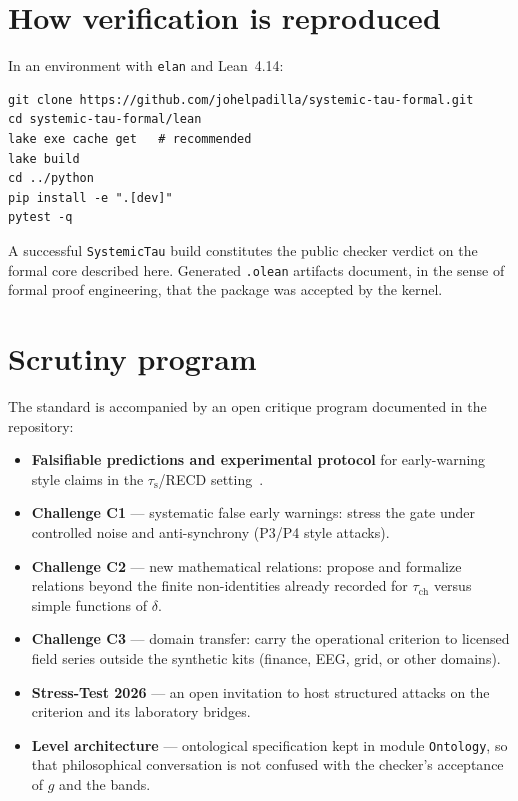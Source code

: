\documentclass[11pt,a4paper]{article}
\newcommand{\taus}{\tau_{\mathrm{s}}}
\newcommand{\tauch}{\tau_{\mathrm{ch}}}
\begin{document}
\section{How verification is reproduced}

In an environment with \texttt{elan} and Lean~4.14:

\begin{verbatim}
git clone https://github.com/johelpadilla/systemic-tau-formal.git
cd systemic-tau-formal/lean
lake exe cache get   # recommended
lake build
cd ../python
pip install -e ".[dev]"
pytest -q
\end{verbatim}

A successful \texttt{SystemicTau} build constitutes the public checker verdict on the formal core described here. Generated \texttt{.olean} artifacts document, in the sense of formal proof engineering, that the package was accepted by the kernel.

\section{Scrutiny program}

The standard is accompanied by an open critique program documented in the repository:

\begin{itemize}[leftmargin=1.2em]
  \item \textbf{Falsifiable predictions and experimental protocol} for early-warning style claims in the \(\taus\)/RECD setting~\cite{scheffer2009,dakos2012,boettiger2013}.
  \item \textbf{Challenge C1} --- systematic false early warnings: stress the gate under controlled noise and anti-synchrony (P3/P4 style attacks).
  \item \textbf{Challenge C2} --- new mathematical relations: propose and formalize relations beyond the finite non-identities already recorded for \(\tauch\) versus simple functions of \(\delta\).
  \item \textbf{Challenge C3} --- domain transfer: carry the operational criterion to licensed field series outside the synthetic kits (finance, EEG, grid, or other domains).
  \item \textbf{Stress-Test 2026} --- an open invitation to host structured attacks on the criterion and its laboratory bridges.
  \item \textbf{Level architecture} --- ontological specification kept in module \texttt{Ontology}, so that philosophical conversation is not confused with the checker's acceptance of \(g\) and the bands.
\end{itemize}
\end{document}
